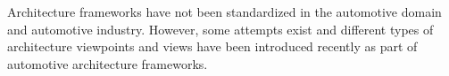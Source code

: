 
Architecture frameworks have not been standardized in the automotive domain and automotive industry. 
However, some attempts exist and different types of architecture viewpoints and views have been introduced recently as part
of automotive architecture frameworks.

%

\patrizio{}

